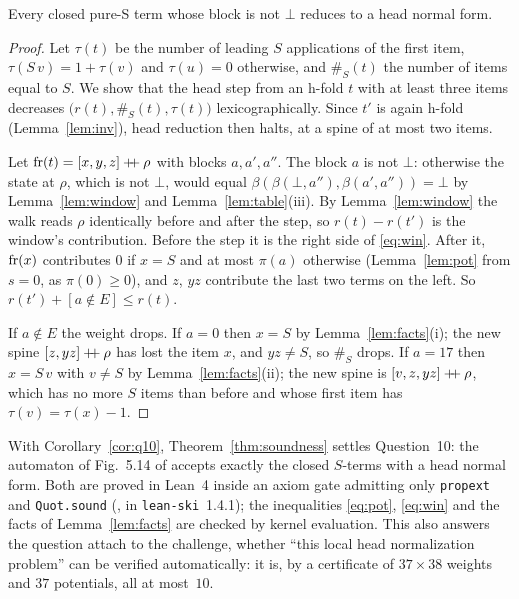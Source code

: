 \begin{theorem}[Soundness]\label{thm:soundness}
Every closed pure-S term whose block is not $\bot$ reduces to a head normal form.
\end{theorem}
\begin{proof}
Let $\tau(t)$ be the number of leading $S$ applications of the first item,
$\tau(S\,v)=1+\tau(v)$ and $\tau(u)=0$ otherwise, and $\#_S(t)$ the number of items equal to $S$.
We show that the head step from an h-fold $t$ with at least three items decreases
$\bigl(r(t),\#_S(t),\tau(t)\bigr)$ lexicographically. Since $t'$ is again h-fold
(Lemma~\ref{lem:inv}), head reduction then halts, at a spine of at most two items.

Let $\operatorname{fr}(t)=[x,y,z]\mathbin{+\!\!+}\rho$ with blocks $a,a',a''$. The block $a$ is
not $\bot$: otherwise the state at $\rho$, which is not $\bot$, would equal
$\beta(\beta(\bot,a''),\beta(a',a''))=\bot$ by Lemma~\ref{lem:window} and Lemma~\ref{lem:table}(iii). By
Lemma~\ref{lem:window} the walk reads $\rho$ identically before and after the step, so
$r(t)-r(t')$ is the window's contribution. Before the step it is the right side of
\eqref{eq:win}. After it, $\operatorname{fr}(x)$ contributes $0$ if $x=S$ and at most $\pi(a)$
otherwise (Lemma~\ref{lem:pot} from $s=0$, as $\pi(0)\ge0$), and $z$, $yz$ contribute
the last two terms on the left. So $r(t')+[a\notin E]\le r(t)$.

If $a\notin E$ the weight drops. If $a=0$ then $x=S$ by Lemma~\ref{lem:facts}(i); the new spine
$[z,yz]\mathbin{+\!\!+}\rho$ has lost the item $x$, and $yz\ne S$, so $\#_S$ drops. If
$a=17$ then $x=S\,v$ with $v\ne S$ by Lemma~\ref{lem:facts}(ii); the new spine is
$[v,z,yz]\mathbin{+\!\!+}\rho$, which has no more $S$ items than before and whose first
item has $\tau(v)=\tau(x)-1$.
\end{proof}

With Corollary~\ref{cor:q10}, Theorem~\ref{thm:soundness} settles Question~10: the
automaton of Fig.~5.14 of \citet{dots} accepts exactly the closed $S$-terms with a head
normal form. Both are proved in Lean~4 inside an axiom gate admitting only
\texttt{propext} and \texttt{Quot.sound} (,  in
\texttt{lean-ski}~1.4.1); the inequalities \eqref{eq:pot}, \eqref{eq:win} and the facts
of Lemma~\ref{lem:facts} are checked by kernel evaluation. This also answers the
question \citet{dots} attach to the challenge, whether ``this local head normalization
problem'' can be verified automatically: it is, by a certificate of $37\times38$ weights and $37$ potentials, all at most~$10$.

